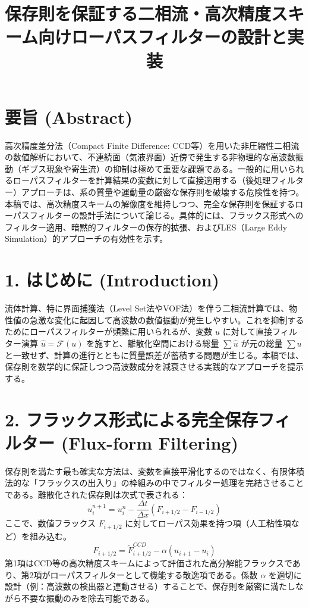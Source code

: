 \documentclass[12pt, a4paper, titlepage]{article}
\title{保存則を保証する二相流・高次精度スキーム向けローパスフィルターの設計と実装}
\author{}
\date{}
\begin{document}
\maketitle

\section*{要旨 (Abstract)}
高次精度差分法（Compact Finite Difference: CCD等）を用いた非圧縮性二相流の数値解析において、不連続面（気液界面）近傍で発生する非物理的な高波数振動（ギブス現象や寄生流）の抑制は極めて重要な課題である。一般的に用いられるローパスフィルターを計算結果の変数に対して直接適用する（後処理フィルター）アプローチは、系の質量や運動量の厳密な保存則を破壊する危険性を持つ。本稿では、高次精度スキームの解像度を維持しつつ、完全な保存則を保証するローパスフィルターの設計手法について論じる。具体的には、フラックス形式へのフィルター適用、暗黙的フィルターの保存的拡張、およびLES（Large Eddy Simulation）的アプローチの有効性を示す。

\section*{1. はじめに (Introduction)}
流体計算、特に界面捕獲法（Level Set法やVOF法）を伴う二相流計算では、物性値の急激な変化に起因して高波数の数値振動が発生しやすい。これを抑制するためにローパスフィルターが頻繁に用いられるが、変数 $u$ に対して直接フィルター演算 $\hat{u} = \mathcal{F}(u)$ を施すと、離散化空間における総量 $\sum \hat{u}$ が元の総量 $\sum u$ と一致せず、計算の進行とともに質量誤差が蓄積する問題が生じる。本稿では、保存則を数学的に保証しつつ高波数成分を減衰させる実践的なアプローチを提示する。

\section*{2. フラックス形式による完全保存フィルター (Flux-form Filtering)}
保存則を満たす最も確実な方法は、変数を直接平滑化するのではなく、有限体積法的な「フラックスの出入り」の枠組みの中でフィルター処理を完結させることである。離散化された保存則は次式で表される：
$$u_i^{n+1} = u_i^n - \frac{\Delta t}{\Delta x} \left( F_{i+1/2} - F_{i-1/2} \right)$$ここで、数値フラックス $F_{i+1/2}$ に対してローパス効果を持つ項（人工粘性項など）を組み込む。$$F_{i+1/2} = \tilde{F}_{i+1/2}^{CCD} - \alpha (u_{i+1} - u_i)$$第1項はCCD等の高次精度スキームによって評価された高分解能フラックスであり、第2項がローパスフィルターとして機能する散逸項である。係数 $\alpha$ を適切に設計（例：高波数の検出器と連動させる）することで、保存則を厳密に満たしながら不要な振動のみを除去可能である。
\end{document}
